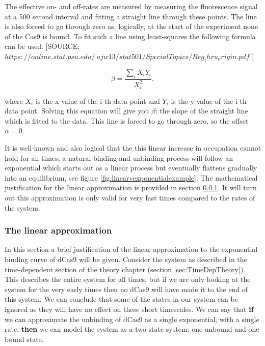 The effective on- and off-rates are measured by measuring the fluorescence signal at a 500 second interval and fitting a straight line through these points. The line is also forced to go through zero as, logically, at the start of the experiment none of the Cas9 is bound. To fit such a line using least-squares the following formula can be used: [SOURCE: $https://online.stat.psu.edu/~ajw13/stat501/SpecialTopics/Reg_thru_origin.pdf$ ]

\begin{equation}
\beta = \frac{\sum_i X_iY_i}{X_i^2},
\label{eq:slopeleastsquares}
\end{equation}

where $X_i$ is the x-value of the i-th data point and $Y_i$ is the y-value of the i-th data point. Solving this equation will give you $\beta$: the slope of the straight line which is fitted to the data. This line is forced to go through zero, so the offset $\alpha = 0$.

It is well-known and also logical that the this linear increase in occupation cannot hold for all times; a natural binding and unbinding process will follow an exponential which starts out as a linear process but eventually flattens gradually into an equilibrium, see figure \ref{fig:linearvexponentialexample}. The mathematical justification for the linear approximation is provided in section \ref{sec:mathematicaljustificationlinearapprox}. It will turn out this approximation is only valid for very fast times compared to the rates of the system.


\subsubsection{The linear approximation}
\label{sec:mathematicaljustificationlinearapprox}

In this section a brief justification of the linear approximation to the exponential binding curve of dCas9 will be given. Consider the system as described in the time-dependent section of the theory chapter (section \ref{sec:TimeDepTheory}). This describes the entire system for all times, but if we are only looking at the system for the very early times then no dCas9 will have made it to the end of this system. We can conclude that some of the states in our system can be ignored as they will have no effect on these short timescales. We can say that \textbf{if} we can approximate the unbinding of dCas9 as a single exponential, with a single rate, \textbf{then} we can model the system as a two-state system: one unbound and one bound state.

